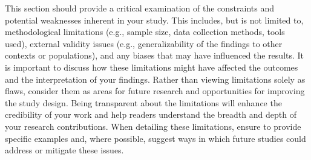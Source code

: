 This section should provide a critical examination of the constraints and potential weaknesses inherent in your study. This includes, but is not limited to, methodological limitations (e.g., sample size, data collection methods, tools used), external validity issues (e.g., generalizability of the findings to other contexts or populations), and any biases that may have influenced the results. It is important to discuss how these limitations might have affected the outcomes and the interpretation of your findings. Rather than viewing limitations solely as flaws, consider them as areas for future research and opportunities for improving the study design. Being transparent about the limitations will enhance the credibility of your work and help readers understand the breadth and depth of your research contributions. When detailing these limitations, ensure to provide specific examples and, where possible, suggest ways in which future studies could address or mitigate these issues.